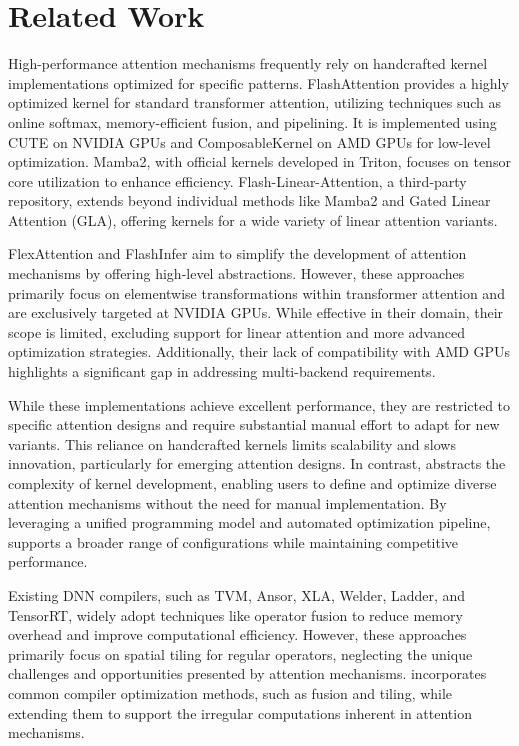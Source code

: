\section{Related Work}
\vspace{-2mm}

High-performance attention mechanisms frequently rely on handcrafted kernel implementations optimized for specific patterns. FlashAttention\cite{dao2022flashattention} provides a highly optimized kernel for standard transformer attention, utilizing techniques such as online softmax, memory-efficient fusion, and pipelining. It is implemented using CUTE\cite{nvidia2024cutlass} on NVIDIA GPUs and ComposableKernel on AMD GPUs for low-level optimization.  Mamba2\cite{dao2024mamba2}, with official kernels developed in Triton\cite{triton}, focuses on tensor core utilization to enhance efficiency. Flash-Linear-Attention\cite{yang2024fla}, a third-party repository, extends beyond individual methods like Mamba2 and Gated Linear Attention (GLA), offering kernels for a wide variety of linear attention variants.

FlexAttention\cite{dong2024flexattentionprogrammingmodel} and FlashInfer\cite{ye2025flashinferefficientcustomizableattention} aim to simplify the development of attention mechanisms by offering high-level abstractions. However, these approaches primarily focus on elementwise transformations within transformer attention and are exclusively targeted at NVIDIA GPUs. While effective in their domain, their scope is limited, excluding support for linear attention and more advanced optimization strategies. Additionally, their lack of compatibility with AMD GPUs highlights a significant gap in addressing multi-backend requirements.

While these implementations achieve excellent performance, they are restricted to specific attention designs and require substantial manual effort to adapt for new variants. This reliance on handcrafted kernels limits scalability and slows innovation, particularly for emerging attention designs. In contrast, \oursys{} abstracts the complexity of kernel development, enabling users to define and optimize diverse attention mechanisms without the need for manual implementation. By leveraging a unified programming model and automated optimization pipeline, \oursys{} supports a broader range of configurations while maintaining competitive performance.

Existing DNN compilers, such as TVM\cite{tvm2018}, Ansor\cite{ansor}, XLA\cite{xla}, Welder\cite{shi2023welder}, Ladder\cite{wang2024ladder}, and TensorRT\cite{tensorrt}, widely adopt techniques like operator fusion to reduce memory overhead and improve computational efficiency. However, these approaches primarily focus on spatial tiling for regular operators, neglecting the unique challenges and opportunities presented by attention mechanisms. \oursys{} incorporates common compiler optimization methods, such as fusion and tiling, while extending them to support the irregular computations inherent in attention mechanisms. 

